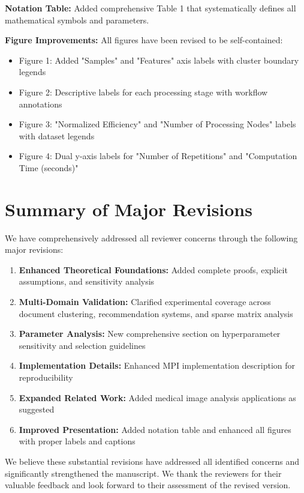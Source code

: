\documentclass{ar2rc}
\begin{document}




\textbf{Notation Table:} Added comprehensive Table 1 that systematically defines all mathematical symbols and parameters.

\textbf{Figure Improvements:} All figures have been revised to be self-contained:
\begin{itemize}
  \item Figure 1: Added "Samples" and "Features" axis labels with cluster boundary legends
  \item Figure 2: Descriptive labels for each processing stage with workflow annotations
  \item Figure 3: "Normalized Efficiency" and "Number of Processing Nodes" labels with dataset legends
  \item Figure 4: Dual y-axis labels for "Number of Repetitions" and "Computation Time (seconds)"
\end{itemize}


\section{Summary of Major Revisions}

We have comprehensively addressed all reviewer concerns through the following major revisions:

\begin{enumerate}
  \item \textbf{Enhanced Theoretical Foundations:} Added complete proofs, explicit assumptions, and sensitivity analysis
  \item \textbf{Multi-Domain Validation:} Clarified experimental coverage across document clustering, recommendation systems, and sparse matrix analysis
  \item \textbf{Parameter Analysis:} New comprehensive section on hyperparameter sensitivity and selection guidelines
  \item \textbf{Implementation Details:} Enhanced MPI implementation description for reproducibility
  \item \textbf{Expanded Related Work:} Added medical image analysis applications as suggested
  \item \textbf{Improved Presentation:} Added notation table and enhanced all figures with proper labels and captions
\end{enumerate}

We believe these substantial revisions have addressed all identified concerns and significantly strengthened the manuscript. We thank the reviewers for their valuable feedback and look forward to their assessment of the revised version.

\printbibliography
\end{document}
